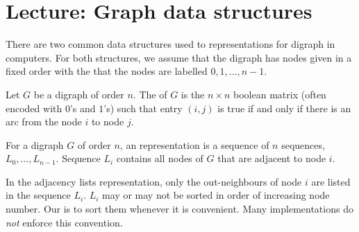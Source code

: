 %
%
%
%

 

\chapter{Lecture: Graph data structures} \label{sec:graph-reps}

There are two common data structures used to representations for digraph in computers. For both structures, we assume
that the digraph has nodes given in a fixed order with the
 that the nodes are labelled $0, 1, \dots, n - 1$.

\begin{Definition}
Let $G$ be a digraph of order $n$. The  of $G$
is the $n\times n$ boolean matrix (often encoded with $0$'s and $1$'s)
such that entry $(i,j)$ is true if and only if there is an arc from the
node $i$ to node $j$.
\end{Definition}

\begin{Definition}
For a digraph $G$ of order $n$, an 
representation is a sequence of $n$ sequences, $L_0, \dots, L_{n-1}$. 
Sequence $L_i$  contains all nodes of $G$ that are adjacent to node $i$.
\end{Definition}

In the adjacency lists representation, only the out-neighbours of node $i$ are listed in the sequence $L_i$. $L_i$ may or may not be sorted in order of increasing node number. 
Our  is to sort them whenever it is convenient. Many implementations do \emph{not} enforce this convention.


